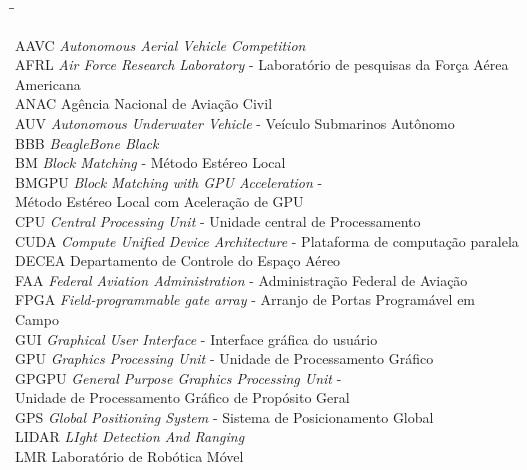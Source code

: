\begin{tabbing}
\hspace*{0.5cm}\=\hspace{2.5cm}\= \kill

\> AAVC		\> \textit{Autonomous Aerial Vehicle Competition}									\\
\> AFRL		\> \textit{Air Force Research Laboratory} - Laboratório de pesquisas da Força Aérea Americana 				\\ 
\> ANAC		\> Agência Nacional de Aviação Civil 											\\
\> AUV		\> \textit{Autonomous Underwater Vehicle} - Veículo Submarinos Autônomo	 						\\
\> BBB		\> \textit{BeagleBone Black}	 											\\
\> BM		\> \textit{Block Matching} - Método Estéreo Local	 								\\
\> BMGPU	\> \textit{Block Matching with GPU Acceleration} - 									\\
\>		\> Método Estéreo Local com Aceleração de GPU										\\
\> CPU		\> \textit{Central Processing Unit} - Unidade central de Processamento							\\
\> CUDA		\> \textit{Compute Unified Device Architecture} - Plataforma de computação paralela					\\
\> DECEA	\> Departamento de Controle do Espaço Aéreo										\\
\> FAA	 	\> \textit{Federal Aviation Administration} - Administração Federal de Aviação						\\
\> FPGA  	\> \textit{Field-programmable gate array} - Arranjo de Portas Programável em Campo					\\
\> GUI 	 	\> \textit{Graphical User Interface} - Interface gráfica do usuário							\\
\> GPU 	 	\> \textit{Graphics Processing Unit} - Unidade de Processamento Gráfico							\\
\> GPGPU 	\> \textit{General Purpose Graphics Processing Unit} -  								\\
\>		\> Unidade de Processamento Gráfico de Propósito Geral									\\
\> GPS 	 	\> \textit{Global Positioning System} - Sistema de Posicionamento Global						\\
\> LIDAR 	\> \textit{LIght Detection And Ranging}											\\
\> LMR 	 	\> Laboratório de Robótica Móvel											\\

\end{tabbing}
